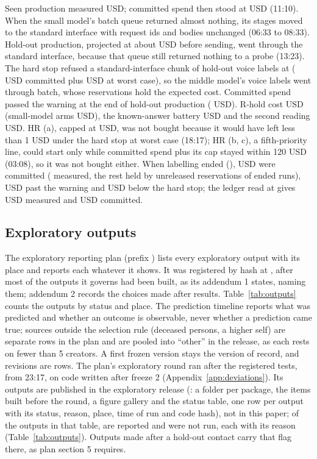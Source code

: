 Seen production measured \ProdSeenUsd{} USD; committed spend then stood at \ProdCommittedUsd{} USD (11:10). When the
small model's batch queue returned almost nothing, its stages moved to the standard interface with request ids and
bodies unchanged (06:33 to 08:33). Hold-out production, projected at about \HoldoutProdProjUsd{} USD before sending,
went through the standard interface, because that queue still returned nothing to a probe (13:23). The hard stop
refused a standard-interface chunk of hold-out voice labels at \HardStopRefusalStamp{} (\HardStopRefusalCommitted{} USD
committed plus \HardStopRefusalWorst{} USD at worst case), so the middle model's voice labels went through batch, whose
reservations hold the expected cost. Committed spend passed the warning at the end of hold-out production
(\WarningPassedCommitted{} USD). R-hold cost \RholdUsd{} USD (small-model arms \RholdSmallUsd{} USD), the known-answer
battery \KaCost{} USD and the second reading \DblCost{} USD. HR (a), capped at \HrAUsd{} USD, was not bought because it
would have left less than 1 USD under the hard stop at worst case (18:17); HR (b, c), a fifth-priority line, could start
only while committed spend plus its cap stayed within 120 USD (03:08), so it was not bought either. When labelling ended
(\LabellingDoneStamp), \FinalCommitted{} USD were committed (\SpendMeasured{} measured, the rest held by unreleased
reservations of ended runs), \FinalPastWarning{} USD past the warning and \FinalBelowStop{} USD below the hard stop; the
ledger read at \SpendStamp{} gives \SpendMeasured{} USD measured and \SpendCommitted{} USD committed.

\subsection{Exploratory outputs}
\label{app:outputs}

The exploratory reporting plan (prefix \PlanShaPrefix) lists every exploratory output with its place and reports each
whatever it shows. It was registered by hash at \PlanRegisteredStamp, after most of the outputs it governs had been
built, as its addendum 1 states, naming them; addendum 2 records the choices made after results. Table~\ref{tab:outputs}
counts the outputs by status and place. The prediction timeline reports what was predicted and whether an outcome is
observable, never whether a prediction came true; sources outside the selection rule (deceased persons, a higher self)
are separate rows in the plan and are pooled into ``other'' in the release, as each rests on fewer than 5 creators. A
first frozen version stays the version of record, and revisions are rows. The plan's exploratory round ran after the
registered tests, from 23:17, on code written after freeze 2 (Appendix~\ref{app:deviations}). Its outputs are published
in the exploratory release (\ExpRelease: a folder per package, the items built before the round, a figure gallery and
the status table, one row per output with its status, reason, place, time of run and code hash), not in this paper; of
the \ExpOutputs{} outputs in that table, \ExpReported{} are reported and \ExpNotRun{} were not run, each with its reason
(Table~\ref{tab:outputs}). Outputs made after a hold-out contact carry that flag there, as plan section 5 requires.

